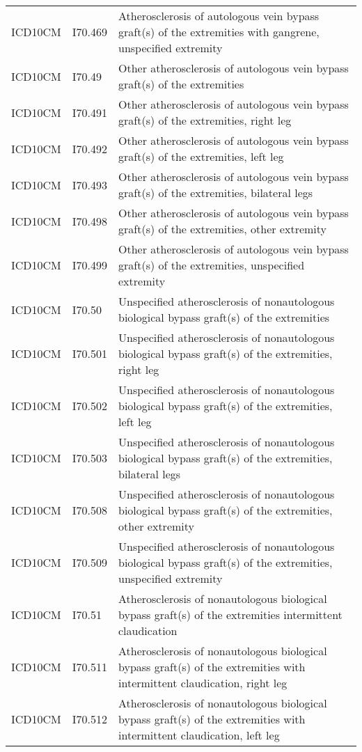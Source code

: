 \begin{longtable}{p{}p{}p{}}
  ICD10CM & I70.469 & Atherosclerosis of autologous vein bypass graft(s) of the extremities with gangrene, unspecified extremity \\ 
  ICD10CM & I70.49 & Other atherosclerosis of autologous vein bypass graft(s) of the extremities \\ 
  ICD10CM & I70.491 & Other atherosclerosis of autologous vein bypass graft(s) of the extremities, right leg \\ 
  ICD10CM & I70.492 & Other atherosclerosis of autologous vein bypass graft(s) of the extremities, left leg \\ 
  ICD10CM & I70.493 & Other atherosclerosis of autologous vein bypass graft(s) of the extremities, bilateral legs \\ 
  ICD10CM & I70.498 & Other atherosclerosis of autologous vein bypass graft(s) of the extremities, other extremity \\ 
  ICD10CM & I70.499 & Other atherosclerosis of autologous vein bypass graft(s) of the extremities, unspecified extremity \\ 
  ICD10CM & I70.50 & Unspecified atherosclerosis of nonautologous biological bypass graft(s) of the extremities \\ 
  ICD10CM & I70.501 & Unspecified atherosclerosis of nonautologous biological bypass graft(s) of the extremities, right leg \\ 
  ICD10CM & I70.502 & Unspecified atherosclerosis of nonautologous biological bypass graft(s) of the extremities, left leg \\ 
  ICD10CM & I70.503 & Unspecified atherosclerosis of nonautologous biological bypass graft(s) of the extremities, bilateral legs \\ 
  ICD10CM & I70.508 & Unspecified atherosclerosis of nonautologous biological bypass graft(s) of the extremities, other extremity \\ 
  ICD10CM & I70.509 & Unspecified atherosclerosis of nonautologous biological bypass graft(s) of the extremities, unspecified extremity \\ 
  ICD10CM & I70.51 & Atherosclerosis of nonautologous biological bypass graft(s) of the extremities intermittent claudication \\ 
  ICD10CM & I70.511 & Atherosclerosis of nonautologous biological bypass graft(s) of the extremities with intermittent claudication, right leg \\ 
  ICD10CM & I70.512 & Atherosclerosis of nonautologous biological bypass graft(s) of the extremities with intermittent claudication, left leg \\ 

\end{longtable}

